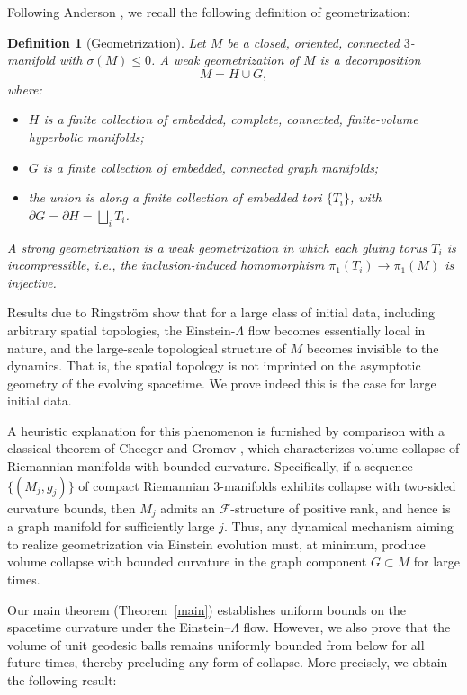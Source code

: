 \documentclass{amsart}
\newtheorem{definition}{Definition}
\begin{document}
\noindent Following Anderson \cite{anderson2001long}, we recall the following definition of geometrization:

\begin{definition}[Geometrization]
Let \( M \) be a closed, oriented, connected $3$-manifold with \( \sigma(M) \leq 0 \). A \emph{weak geometrization} of \( M \) is a decomposition
\[
M = H \cup G,
\]
where:
\begin{itemize}
  \item \( H \) is a finite collection of embedded, complete, connected, finite-volume hyperbolic manifolds;
  \item \( G \) is a finite collection of embedded, connected graph manifolds;
  \item the union is along a finite collection of embedded tori \( \{T_i\} \), with \( \partial G = \partial H = \bigsqcup_i T_i \).
\end{itemize}
A \emph{strong geometrization} is a weak geometrization in which each gluing torus \( T_i \) is incompressible, i.e., the inclusion-induced homomorphism \( \pi_1(T_i) \to \pi_1(M) \) is injective.
\end{definition}

\noindent  Results due to Ringström \cite{ringstrom2008future} show that for a large class of initial data, including arbitrary spatial topologies, the Einstein-$\Lambda$ flow becomes essentially local in nature, and the large-scale topological structure of \( M \) becomes invisible to the dynamics. That is, the spatial topology is not imprinted on the asymptotic geometry of the evolving spacetime. We prove indeed this is the case for large initial data. 

\noindent A heuristic explanation for this phenomenon is furnished by comparison with a classical theorem of Cheeger and Gromov \cite{cheeger1,cheeger2}, which characterizes volume collapse of Riemannian manifolds with bounded curvature. Specifically, if a sequence \( \{(M_j, g_j)\} \) of compact Riemannian $3$-manifolds exhibits collapse with two-sided curvature bounds, then \( M_j \) admits an \( \mathcal{F} \)-structure of positive rank, and hence is a graph manifold for sufficiently large \( j \). Thus, any dynamical mechanism aiming to realize geometrization via Einstein evolution must, at minimum, produce volume collapse with bounded curvature in the graph component \( G \subset M \) for large times.

\noindent Our main theorem (Theorem~\ref{main}) establishes uniform bounds on the spacetime curvature under the Einstein–$\Lambda$ flow. However, we also prove that the volume of unit geodesic balls remains uniformly bounded from below for all future times, thereby precluding any form of collapse. More precisely, we obtain the following result:
\end{document}
